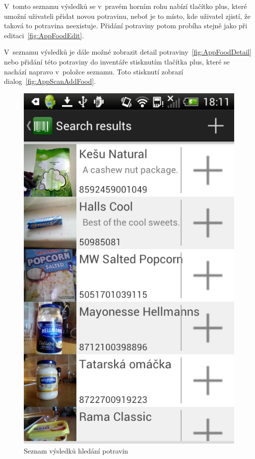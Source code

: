 \documentclass[thesis=B,czech]{FITthesis}[2013/10/20]
\begin{document}
V~tomto seznamu výsledků se v~pravém horním rohu nabízí tlačítko plus, které umožní uživateli přidat novou potravinu, neboť je to místo, kde uživatel zjistí, že taková to potravina neexistuje. Přidání potraviny potom probíha stejně jako při editaci~\ref{fig:AppFoodEdit}.

V~seznamu výsledků je dále možné zobrazit detail potraviny~\ref{fig:AppFoodDetail} nebo přidání této potraviny do inventáře stisknutím tlačítka plus, které se nachází napravo v~položce seznamu. Toto stisknutí zobrazí dialog~\ref{fig:AppScanAddFood}.

\begin{figure}[H]
  \centering
  \includegraphics[scale=0.4]{screenshots/app_search_results.png}
  \caption{Seznam výsledků hledání potravin}
  \label{fig:AppSearchResults}
\end{figure}
\end{document}
